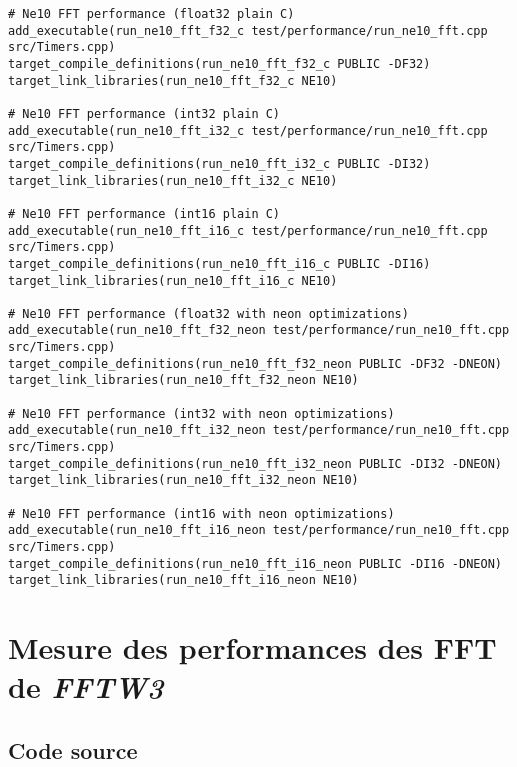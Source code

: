 \documentclass{article}
\begin{document}
\begin{lstlisting}
# Ne10 FFT performance (float32 plain C)
add_executable(run_ne10_fft_f32_c test/performance/run_ne10_fft.cpp src/Timers.cpp)
target_compile_definitions(run_ne10_fft_f32_c PUBLIC -DF32)
target_link_libraries(run_ne10_fft_f32_c NE10)

# Ne10 FFT performance (int32 plain C)
add_executable(run_ne10_fft_i32_c test/performance/run_ne10_fft.cpp src/Timers.cpp)
target_compile_definitions(run_ne10_fft_i32_c PUBLIC -DI32)
target_link_libraries(run_ne10_fft_i32_c NE10)

# Ne10 FFT performance (int16 plain C)
add_executable(run_ne10_fft_i16_c test/performance/run_ne10_fft.cpp src/Timers.cpp)
target_compile_definitions(run_ne10_fft_i16_c PUBLIC -DI16)
target_link_libraries(run_ne10_fft_i16_c NE10)

# Ne10 FFT performance (float32 with neon optimizations)
add_executable(run_ne10_fft_f32_neon test/performance/run_ne10_fft.cpp src/Timers.cpp)
target_compile_definitions(run_ne10_fft_f32_neon PUBLIC -DF32 -DNEON)
target_link_libraries(run_ne10_fft_f32_neon NE10)

# Ne10 FFT performance (int32 with neon optimizations)
add_executable(run_ne10_fft_i32_neon test/performance/run_ne10_fft.cpp src/Timers.cpp)
target_compile_definitions(run_ne10_fft_i32_neon PUBLIC -DI32 -DNEON)
target_link_libraries(run_ne10_fft_i32_neon NE10)

# Ne10 FFT performance (int16 with neon optimizations)
add_executable(run_ne10_fft_i16_neon test/performance/run_ne10_fft.cpp src/Timers.cpp)
target_compile_definitions(run_ne10_fft_i16_neon PUBLIC -DI16 -DNEON)
target_link_libraries(run_ne10_fft_i16_neon NE10)
\end{lstlisting}



\newpage
\section{Mesure des performances des FFT de \emph{FFTW3}}\label{app:perf_fft_fftw3}
\subsection{Code source}\label{app:perf_fft_fftw3_code}
\end{document}
